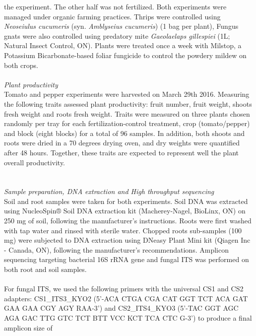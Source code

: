 \documentclass[11pt,]{article}
\begin{document}
the experiment. The other half was not fertilized. Both experiments were
managed under organic farming practices. Thrips were controlled using
\emph{Neoseiulus cucumeris} (syn. \emph{Amblyseius cucumeris}) (1 bag
per plant), Fungus gnats were also controlled using predatory mite
\emph{Gaeolaelaps gillespiei} (1L; Natural Insect Control, ON). Plants
were treated once a week with Milstop, a Potassium Bicarbonate-based
foliar fungicide to control the powdery mildew on both crops.\\
\hspace*{0.333em}\\
\emph{Plant productivity}\\
Tomato and pepper experiments were harvested on March 29th 2016.
Measuring the following traits assessed plant productivity: fruit
number, fruit weight, shoots fresh weight and roots fresh weight. Traits
were measured on three plants chosen randomly per tray for each
fertilization-control treatment, crop (tomato/pepper) and block (eight
blocks) for a total of 96 samples. In addition, both shoots and roots
were dried in a 70 degrees drying oven, and dry weights were quantified
after 48 hours. Together, these traits are expected to represent well
the plant overall productivity.\\
\hspace*{0.333em}\\
\hspace*{0.333em}\\
\emph{Sample preparation, DNA extraction and High throughput
sequencing}\\
Soil and root samples were taken for both experiments. Soil DNA was
extracted using NucleoSpin® Soil DNA extraction kit (Macherey-Nagel,
BioLinx, ON) on 250 mg of soil, following the manufacturer's
instructions. Roots were first washed with tap water and rinsed with
sterile water. Chopped roots sub-samples (100 mg) were subjected to DNA
extraction using DNeasy Plant Mini kit (Qiagen Inc - Canada, ON),
following the manufacturer's recommendations. Amplicon sequencing
targeting bacterial 16S rRNA gene and fungal ITS was performed on both
root and soil samples.\\
\hspace*{0.333em}\\
For fungal ITS, we used the following primers with the universal CS1 and
CS2 adapters: CS1\_ITS3\_KYO2 (5'-ACA CTGA CGA CAT GGT TCT ACA GAT GAA
GAA CGY AGY RAA-3') and CS2\_ITS4\_KYO3 (5'-TAC GGT AGC AGA GAC TTG GTC
TCT BTT VCC KCT TCA CTC G-3') to produce a final amplicon size of
\end{document}
